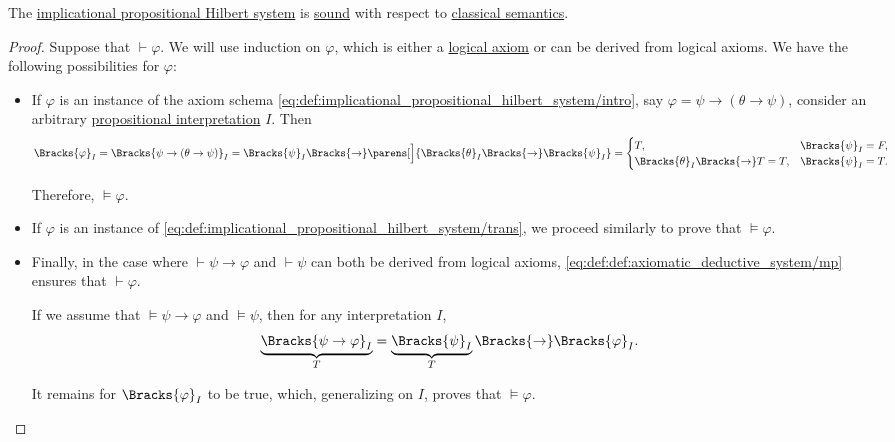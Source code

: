 \begin{proposition}\label{thm:soundness_of_implicational_propositional_deductive_system}
  The \hyperref[def:implicational_propositional_hilbert_system]{implicational propositional Hilbert system} is \hyperref[def:derivability_and_satisfiability/soundness]{sound} with respect to \hyperref[def:propositional_semantics]{classical semantics}.
\end{proposition}
\begin{proof}
  Suppose that \( \vdash \varphi \). We will use induction on \( \varphi \), which is either a \hyperref[def:axiomatic_deductive_system]{logical axiom} or can be derived from logical axioms. We have the following possibilities for \( \varphi \):
  \begin{itemize}
    \item If \( \varphi \) is an instance of the axiom schema \eqref{eq:def:implicational_propositional_hilbert_system/intro}, say \( \varphi = \psi \rightarrow (\theta \rightarrow \psi) \), consider an arbitrary \hyperref[def:propositional_valuation]{propositional interpretation} \( I \). Then
    \begin{equation*}
      \Bracks{\varphi}_I
      =
      \Bracks{\psi \rightarrow (\theta \rightarrow \psi)}_I
      =
      \Bracks{\psi}_I \Bracks{\rightarrow} \parens[\Big]{ \Bracks{\theta}_I \Bracks{\rightarrow} \Bracks{\psi}_I }
      =
      \begin{cases}
        T,                                            &\Bracks{\psi}_I = F, \\
        \Bracks{\theta}_I \Bracks{\rightarrow} T = T, &\Bracks{\psi}_I = T.
      \end{cases}
    \end{equation*}

    Therefore, \( \vDash \varphi \).

    \item If \( \varphi \) is an instance of \eqref{eq:def:implicational_propositional_hilbert_system/trans}, we proceed similarly to prove that \( \vDash \varphi \).

    \item Finally, in the case where \( \vdash \psi \rightarrow \varphi \) and \( \vdash \psi \) can both be derived from logical axioms, \ref{eq:def:def:axiomatic_deductive_system/mp} ensures that \( \vdash \varphi \).

    If we assume that \( \vDash \psi \rightarrow \varphi \) and \( \vDash \psi \), then for any interpretation \( I \),
    \begin{equation*}
      \underbrace{\Bracks{\psi \rightarrow \varphi}_I}_T = \underbrace{\Bracks{\psi}_I}_T \Bracks{\rightarrow} \Bracks{\varphi}_I.
    \end{equation*}

    It remains for \( \Bracks{\varphi}_I \) to be true, which, generalizing on \( I \), proves that \( \vDash \varphi \).
  \end{itemize}
\end{proof}

